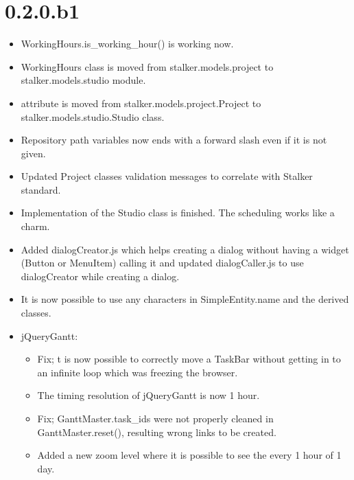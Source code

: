 \documentclass[a4paper,10pt,english]{sphinxmanual}
\begin{document}
\section{0.2.0.b1}
\label{changelog:b1}\begin{itemize}
\item {} 
WorkingHours.is\_working\_hour() is working now.

\item {} 
WorkingHours class is moved from stalker.models.project to
stalker.models.studio module.

\item {} 
 attribute is moved from
stalker.models.project.Project to stalker.models.studio.Studio class.

\item {} 
Repository path variables now ends with a forward slash even if it is not
given.

\item {} 
Updated Project classes validation messages to correlate with Stalker
standard.

\item {} 
Implementation of the Studio class is finished. The scheduling works like a
charm.

\item {} 
Added dialogCreator.js which helps creating a dialog without having a widget
(Button or MenuItem) calling it and updated dialogCaller.js to use
dialogCreator while creating a dialog.

\item {} 
It is now possible to use any characters in SimpleEntity.name and the derived
classes.

\item {} 
jQueryGantt:
\begin{itemize}
\item {} 
Fix; t is now possible to correctly move a TaskBar without getting in to
an infinite loop which was freezing the browser.

\item {} 
The timing resolution of jQueryGantt is now 1 hour.

\item {} 
Fix; GanttMaster.task\_ids were not properly cleaned in GanttMaster.reset(),
resulting wrong links to be created.

\item {} 
Added a new zoom level where it is possible to see the every 1 hour of 1
day.


\end{itemize}
\end{itemize}
\end{document}
